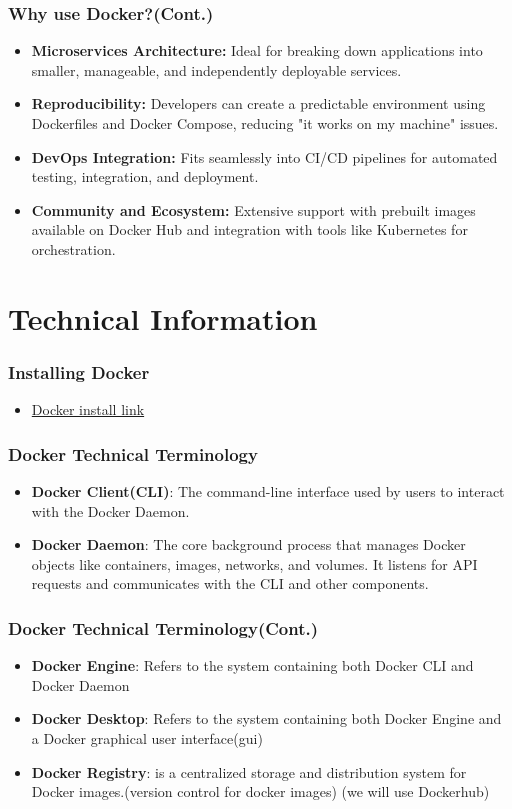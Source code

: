 \documentclass{beamer}
\begin{document}
\begin{frame}\frametitle{Why use Docker?(Cont.)}
\begin{itemize}
\item \textbf{Microservices Architecture:} Ideal for breaking down applications into smaller, manageable, and independently deployable services.
\item \textbf{Reproducibility:} Developers can create a predictable environment using Dockerfiles and Docker Compose, reducing "it works on my machine" issues.
\item \textbf{DevOps Integration:} Fits seamlessly into CI/CD pipelines for automated testing, integration, and deployment.
\item \textbf{Community and Ecosystem:} Extensive support with prebuilt images available on Docker Hub and integration with tools like Kubernetes for orchestration.
\end{itemize}
\end{frame}


\section{Technical Information}
\begin{frame}\frametitle{Installing Docker}
\begin{itemize}
\item \href{https://docs.docker.com/get-started/get-docker/}{Docker install link}   
\end{itemize}
\end{frame}


\begin{frame}\frametitle{Docker Technical Terminology}
\begin{itemize}
\item \textbf{Docker Client(CLI)}: The command-line interface used by users
to interact with the Docker Daemon.
\item \textbf{Docker Daemon}: The core background process that manages Docker
objects like containers, images, networks, and volumes. It listens for API
requests and communicates with the CLI and other components.
\end{itemize}
\end{frame}


\begin{frame}\frametitle{Docker Technical Terminology(Cont.)}
\begin{itemize}
\item \textbf{Docker Engine}: Refers to the system containing both Docker CLI and Docker Daemon
\item \textbf{Docker Desktop}: Refers to the system containing both Docker Engine and a Docker graphical user interface(gui)
\item \textbf{Docker Registry}: is a centralized storage and distribution system for Docker images.(version control for docker images) (we will use Dockerhub)
\end{itemize}
\end{frame}
\end{document}
